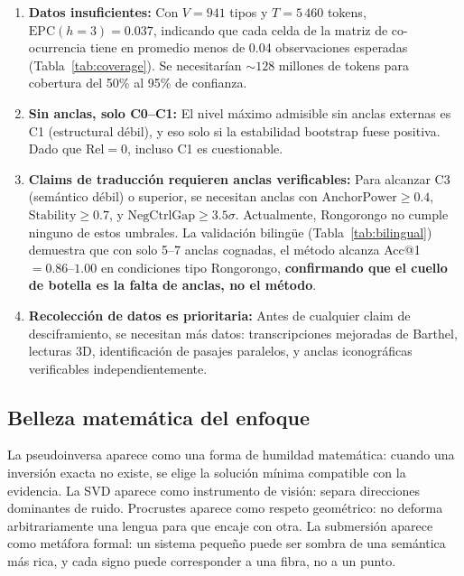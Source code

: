 \documentclass[11pt,a4paper]{article}
\newcommand{\1}{\mathbf{1}}
\numberwithin{equation}{section}
\begin{document}
\begin{enumerate}[label=(\roman*)]
    \item \textbf{Datos insuficientes:} Con $V=941$ tipos y $T=5\,460$ tokens, $\mathrm{EPC}(h=3) = 0.037$, indicando que cada celda de la matriz de co-ocurrencia tiene en promedio menos de 0.04 observaciones esperadas (Tabla~\ref{tab:coverage}). Se necesitarían $\sim\!128$ millones de tokens para cobertura del 50\% al 95\% de confianza.

    \item \textbf{Sin anclas, solo C0--C1:} El nivel máximo admisible sin anclas externas es C1 (estructural débil), y eso solo si la estabilidad bootstrap fuese positiva. Dado que $\mathrm{Rel} = 0$, incluso C1 es cuestionable.

    \item \textbf{Claims de traducción requieren anclas verificables:} Para alcanzar C3 (semántico débil) o superior, se necesitan anclas con $\mathrm{AnchorPower} \geq 0.4$, $\mathrm{Stability} \geq 0.7$, y $\mathrm{NegCtrlGap} \geq 3.5\sigma$. Actualmente, Rongorongo no cumple ninguno de estos umbrales. La validación bilingüe (Tabla~\ref{tab:bilingual}) demuestra que con solo 5--7 anclas cognadas, el método alcanza Acc@1 $= 0.86$--$1.00$ en condiciones tipo Rongorongo, \textbf{confirmando que el cuello de botella es la falta de anclas, no el método}.

    \item \textbf{Recolección de datos es prioritaria:} Antes de cualquier claim de desciframiento, se necesitan más datos: transcripciones mejoradas de Barthel, lecturas 3D, identificación de pasajes paralelos, y anclas iconográficas verificables independientemente.
\end{enumerate}

\subsection{Belleza matemática del enfoque}

La pseudoinversa aparece como una forma de humildad matemática: cuando una inversión exacta no existe, se elige la solución mínima compatible con la evidencia. La SVD aparece como instrumento de visión: separa direcciones dominantes de ruido. Procrustes aparece como respeto geométrico: no deforma arbitrariamente una lengua para que encaje con otra. La submersión aparece como metáfora formal: un sistema pequeño puede ser sombra de una semántica más rica, y cada signo puede corresponder a una fibra, no a un punto.
\end{document}
